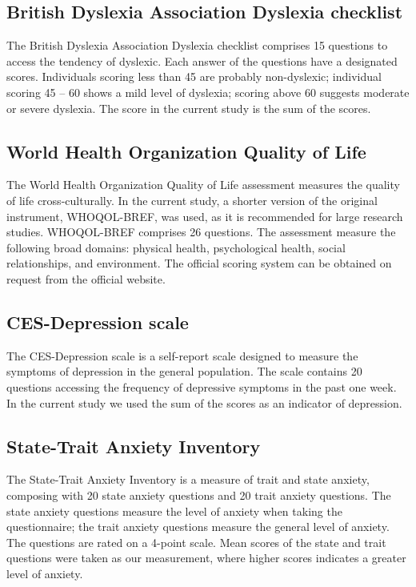 \subsection{British Dyslexia Association Dyslexia checklist}
The British Dyslexia Association Dyslexia checklist \cite{Smythe2001} comprises 15 questions to access the tendency of dyslexic. Each answer of the questions have a designated scores. Individuals scoring less than 45 are probably non-dyslexic; individual scoring 45 – 60 shows a mild level of dyslexia; scoring above 60 suggests moderate or severe dyslexia. The score in the current study is the sum of the scores.  

\subsection{World Health Organization Quality of Life}
The World Health Organization Quality of Life \cite{WHOQOL2002} assessment measures the quality of life cross-culturally.  In the current study, a shorter version of the original instrument, WHOQOL-BREF, was used, as it is recommended for large research studies. WHOQOL-BREF comprises 26 questions. The assessment measure the following broad domains: physical health, psychological health, social relationships, and environment. The official scoring system can be obtained on request from the official website.  

\subsection{CES-Depression scale}
The CES-Depression scale \cite{Radloff1977} is a self-report scale designed to measure the symptoms of depression in the general population. The scale contains 20 questions accessing the frequency of depressive symptoms in the past one week. In the current study we used the sum of the scores as an indicator of depression.
 
\subsection{State-Trait Anxiety Inventory}
The State-Trait Anxiety Inventory \cite{Spielberger1987} is a measure of trait and state anxiety, composing with 20 state anxiety questions and 20 trait anxiety questions. The state anxiety questions measure the level of anxiety when taking the questionnaire; the trait anxiety questions measure the general level of anxiety. The questions are rated on a 4-point scale. Mean scores of the state and trait questions were taken as our measurement, where higher scores indicates a greater level of anxiety. 

